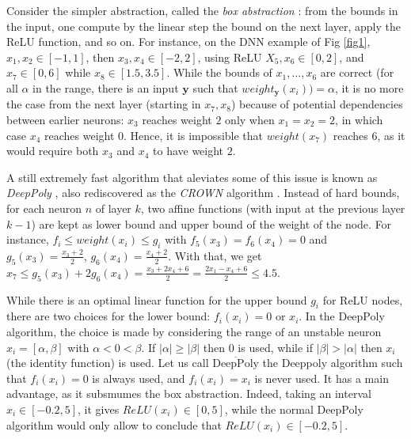\documentclass{llncs}
\newcommand{\vy}{\boldsymbol{y}}
\begin{document}
Consider the simpler abstraction, called the {\em box abstraction} \cite{deeppoly}: from the bounds in the input, one compute by the linear step the bound on the next layer, apply the ReLU function, and so on. For instance, on the DNN example of Fig \ref{fig1}, $x_1,x_2 \in [-1,1]$, then $x_3,x_4 \in [-2,2]$, using ReLU $X_5,x_6 \in [0,2]$, and $x_7 \in [0,6]$ while $x_8 \in [1.5,3.5]$. While the bounds of $x_1, \ldots, x_6$ are correct (for all $\alpha$ 
in the range, there is an input $\vy$ such that $weight_{\vy}(x_i))=\alpha$, 
it is no more the case from the next layer (starting in $x_7,x_8$) because of potential 
dependencies between earlier neurons: $x_3$ reaches weight $2$ only when $x_1=x_2=2$,
in which case $x_4$ reaches weight $0$. Hence, it is impossible that $weight(x_7)$ reaches $6$, as it would require both $x_3$ and $x_4$ to have weight $2$.

A still extremely fast algorithm that aleviates some of this issue is known as {\em DeepPoly} \cite{deeppoly}, also rediscovered as the {\em CROWN} algorithm \cite{crown}. Instead of 
hard bounds, for each neuron $n$ of layer $k$, two affine functions (with input at the previous layer $k-1$) are kept as lower bound and upper bound of the weight of the node.
For instance, $f_i \leq weight(x_i) \leq g_i$ with $f_5(x_3)=f_6(x_4)=0$ and 
$g_5(x_3) = \frac{x_3+2}{2}$,
$g_6(x_4) = \frac{x_4+2}{2}$. 
With that, we get 
$x_7 \leq g_5(x_3) + 2 g_6(x_4) = \frac{x_3 + 2x_4 + 6}{2} = \frac{2x_1 - x_4 + 6}{2}\leq 4.5$.

While there is an optimal linear function for the upper bound $g_i$ for ReLU nodes, there are two choices for the lower bound: $f_i(x_i) = 0$ or $x_i$.
In the DeepPoly algorithm, the choice is made by considering the range of an unstable neuron $x_i=[\alpha,\beta]$ with $\alpha < 0 < \beta$. If $|\alpha|\geq |\beta|$ then $0$ is used, while if $|\beta|>|\alpha|$ then $x_i$ (the identity function) is used. Let us call 
$\overline{\mbox{DeepPoly}}$ the Deeppoly algorithm such that 
$f_i(x_i) = 0$ is always used, and $f_i(x_i) = x_i$ is never used. 
It has a main advantage, as it subsmumes the box abstraction.
Indeed, taking an interval $x_i \in [-0.2,5]$, it gives $ReLU(x_i) \in [0,5]$, 
while the normal DeepPoly algorithm would only allow to conclude that $ReLU(x_i) \in [-0.2,5]$.

\end{document}
